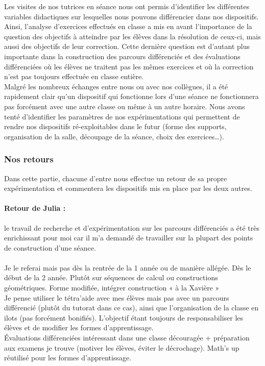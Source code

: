Les visites de nos tutrices en séance nous ont permis d'identifier les différentes variables didactiques sur lesquelles nous pouvons différencier dans nos dispositifs. Ainsi, l'analyse d'exercices effectués en classe a mis en avant l'importance de la question des objectifs à atteindre par les élèves dans la résolution de ceux-ci, mais aussi des objectifs de leur correction. Cette dernière question est d'autant plus importante dans la construction des parcours différenciés et des évaluations différenciées où les élèves ne traitent pas les mêmes exercices et où la correction n'est pas toujours effectuée en classe entière.\\
Malgré les nombreux échanges entre nous ou avec nos collègues, il a été rapidement clair qu'un dispositif qui fonctionne lors d'une séance ne fonctionnera pas forcément avec une autre classe ou même à un autre horaire. Nous avons tenté d'identifier les paramètres de nos expérimentations qui permettent de rendre nos dispositifs ré-exploitables dans le futur (forme des supports, organisation de la salle, découpage de la séance, choix des exercices\ldots).

\subsubsection{Nos retours}\label{sec:retours}
Dans cette partie, chacune d'entre nous effectue un retour de sa propre expérimentation et commentera les dispositifs mis en place par les deux autres. \\
\paragraph*{Retour de Julia :}
le travail de recherche et d'expérimentation sur les parcours différenciés a été très enrichissant pour moi car il m'a demandé de travailler sur la plupart des points de construction d'une séance. \\
\\
Je le referai mais pas dès la rentrée de la 1 année ou de manière allégée. Dès le début de la 2 année. Plutôt sur séquences de calcul ou constructions géométriques. Forme modifiée, intégrer construction « à la Xavière »\\
Je pense utiliser le tétra'aide avec mes élèves mais pas avec un parcours différencié (plutôt du tutorat dans ce cas), ainsi que l'organisation de la classe en ilots (pas forcément bonifiés). L'objectif étant toujours de responsabiliser les élèves et de modifier les formes d'apprentissage.\\
Évaluations différenciées intéressant dans une classe découragée + préparation aux examens je trouve (motiver les élèves, éviter le décrochage).
Math's up réutilisé pour les formes d'apprentissage.

